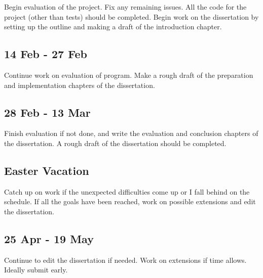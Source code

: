 Begin evaluation of the project. Fix any remaining issues. All the code for the project (other than tests) should be completed. Begin work on the dissertation by setting up the outline and making a draft of the introduction chapter. 

\subsection*{14 Feb - 27 Feb}

Continue work on evaluation of program. Make a rough draft of the preparation and implementation chapters of the dissertation. 

\subsection*{28 Feb - 13 Mar}

Finish evaluation if not done, and write the evaluation and conclusion chapters of the dissertation. A rough draft of the dissertation should be completed. 

\subsection*{Easter Vacation}

Catch up on work if the unexpected difficulties come up or I fall behind on the schedule. If all the goals have been reached, work on possible extensions and edit the dissertation.

\subsection*{25 Apr - 19 May}

Continue to edit the dissertation if needed. Work on extensions if time allows. Ideally submit early. 


